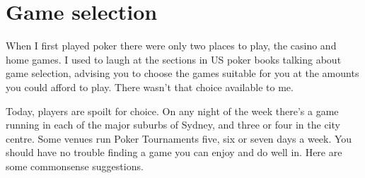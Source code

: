 \chapter{Game selection}


When I first played poker there were only two places to
play, the casino and home games.
I used to laugh at the sections in US poker books talking about 
game selection, advising you to choose the games suitable for you at
the amounts you could afford to play. There wasn't that
choice available to me.

Today, players are spoilt for choice. On any night
of the week there's a game running in each of 
the major suburbs of Sydney, and three or four in
the city centre. Some venues run Poker Tournaments five, six or seven
days a week. You should have no trouble finding a game
you can enjoy and do well in. Here are some commonsense
suggestions.


